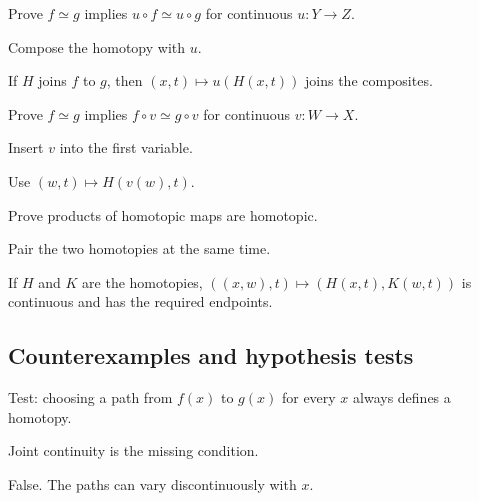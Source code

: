 \begin{exercise}[Postcomposition]\label{exr:viii01-ped-07}
Prove $f\simeq g$ implies $u\circ f\simeq u\circ g$ for continuous $u:Y\to Z$.
\end{exercise}
\begin{hint}
Compose the homotopy with $u$.
\end{hint}
\begin{solution}
If $H$ joins $f$ to $g$, then $(x,t)\mapsto u(H(x,t))$ joins the composites.
\end{solution}

\begin{exercise}[Precomposition]\label{exr:viii01-ped-08}
Prove $f\simeq g$ implies $f\circ v\simeq g\circ v$ for continuous $v:W\to X$.
\end{exercise}
\begin{hint}
Insert $v$ into the first variable.
\end{hint}
\begin{solution}
Use $(w,t)\mapsto H(v(w),t)$.
\end{solution}

\begin{exercise}\label{exr:viii01-ped-09}
Prove products of homotopic maps are homotopic.
\end{exercise}
\begin{hint}
Pair the two homotopies at the same time.
\end{hint}
\begin{solution}
If $H$ and $K$ are the homotopies, $((x,w),t)\mapsto(H(x,t),K(w,t))$ is continuous and has the required endpoints.
\end{solution}

\subsection*{Counterexamples and hypothesis tests}

\begin{exercise}\label{exr:viii01-ped-10}
Test: choosing a path from $f(x)$ to $g(x)$ for every $x$ always defines a homotopy.
\end{exercise}
\begin{hint}
Joint continuity is the missing condition.
\end{hint}
\begin{solution}
False.  The paths can vary discontinuously with $x$.
\end{solution}


